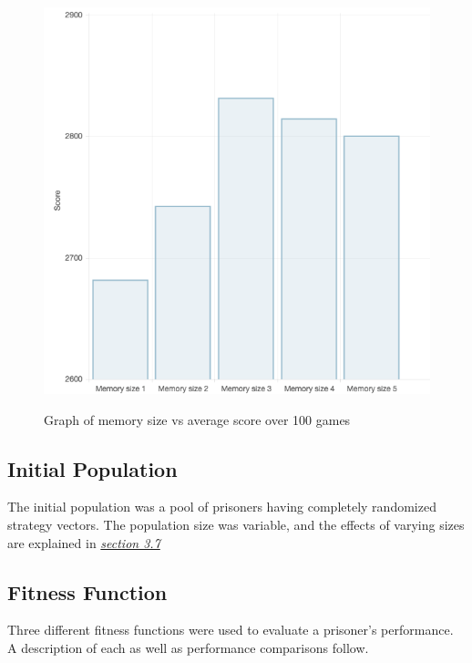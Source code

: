\documentclass[12pt]{article}
\begin{document}
\begin{figure}[h]
    \caption{Graph of memory size vs average score over 100 games}
    \centering
    \includegraphics[scale=0.6]{figures/memsize-vs-score.png}
    \label{fig1}
\end{figure}

\subsection{Initial Population}
The initial population was a pool of prisoners having completely randomized
strategy vectors.  The population size was variable, and the effects of varying
sizes are explained in \textit{\hyperref[vpg]{section 3.7}}

\subsection{Fitness Function}

Three different fitness functions were used to evaluate a prisoner's performance.
A description of each as well as performance comparisons follow.
\end{document}
